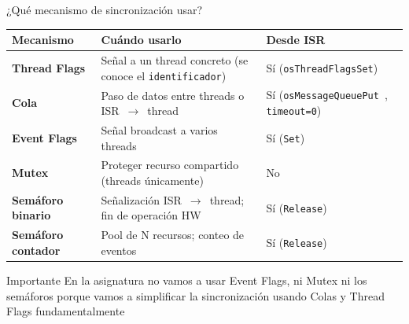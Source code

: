\begin{frame}{¿Qué mecanismo de sincronización usar?}
    \scriptsize
    \begin{table}[H]
    \centering
    \begin{tabular}{|p{3.2cm}|p{4.5cm}|p{3.2cm}|}
    \hline
    \textbf{Mecanismo} & \textbf{Cuándo usarlo} & \textbf{Desde ISR} \\
    \hline
    \textbf{Thread Flags}
        & Señal a un thread concreto (se conoce el \texttt{identificador})
        & Sí (\texttt{osThreadFlagsSet}) \\
    \hline
    \textbf{Cola}
        & Paso de datos entre threads o ISR~$\to$~thread
        & Sí (\texttt{osMessageQueuePut }, \texttt{timeout=0}) \\
    \hline
    \textbf{Event Flags}
        & Señal broadcast a varios threads
        & Sí (\texttt{Set}) \\
    \hline
    \textbf{Mutex}
        & Proteger recurso compartido (threads únicamente)
        & No \\
    \hline
    \textbf{Semáforo binario}
        & Señalización ISR~$\to$~thread; fin de operación HW
        & Sí (\texttt{Release}) \\
    \hline
    \textbf{Semáforo contador}
        & Pool de N recursos; conteo de eventos
        & Sí (\texttt{Release}) \\
    \hline
    \end{tabular}
    \end{table}
    \begin{exampleblock}{Importante}
         En la asignatura no vamos a usar Event Flags, ni Mutex ni los semáforos porque vamos a simplificar la sincronización usando Colas y Thread Flags fundamentalmente
     \end{exampleblock}
\end{frame}

